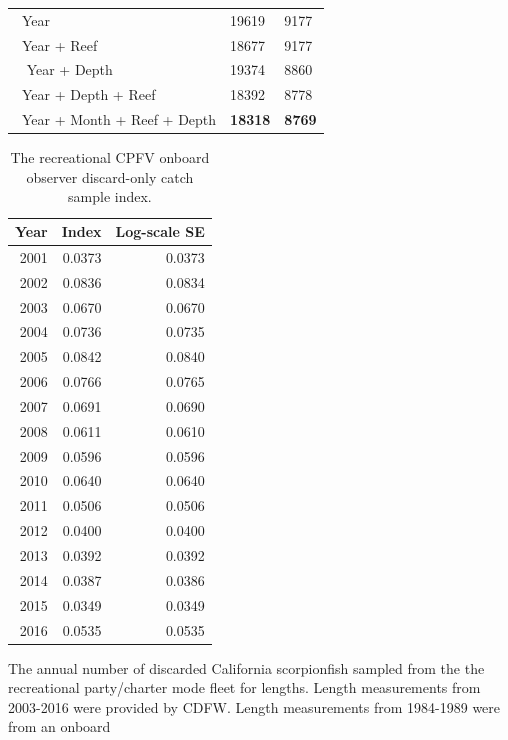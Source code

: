 \documentclass[12pt,]{article}
\begin{document}
\begin{table}[ht]
\begin{tabular}{lll}
  \hline
~Year & 19619 & 9177 \\ 
  ~Year + Reef & 18677 & 9177 \\ 
  ~ Year + Depth & 19374 & 8860 \\ 
  ~Year + Depth + Reef & 18392 & 8778 \\ 
  ~Year + Month + Reef + Depth & \textbf{18318} & \textbf{8769} \\ 
   \hline
\end{tabular}
\end{table}\begin{table}[ht]
\centering
\caption{The recreational CPFV
                                            onboard observer discard-only
                                            catch sample index.} 
\label{tab:Fleet6_RecDD_onboard_index}
\begin{tabular}{rrr}
  \hline
Year & Index & Log-scale SE \\ 
  \hline
 2001 & 0.0373 & 0.0373 \\ 
   2002 & 0.0836 & 0.0834 \\ 
   2003 & 0.0670 & 0.0670 \\ 
   2004 & 0.0736 & 0.0735 \\ 
   2005 & 0.0842 & 0.0840 \\ 
   2006 & 0.0766 & 0.0765 \\ 
   2007 & 0.0691 & 0.0690 \\ 
   2008 & 0.0611 & 0.0610 \\ 
   2009 & 0.0596 & 0.0596 \\ 
   2010 & 0.0640 & 0.0640 \\ 
   2011 & 0.0506 & 0.0506 \\ 
   2012 & 0.0400 & 0.0400 \\ 
   2013 & 0.0392 & 0.0392 \\ 
   2014 & 0.0387 & 0.0386 \\ 
   2015 & 0.0349 & 0.0349 \\ 
   2016 & 0.0535 & 0.0535 \\ 
   \hline
\end{tabular}
\end{table}\begin{table}[ht]
\centering
\caption{The annual number of discarded California scorpionfish 
                                              sampled from the the recreational party/charter 
                                              mode fleet for lengths. Length measurements
                                            from 2003-2016 were provided by CDFW.  
                                            Length measurements from 1984-1989 were from an onboard
}
\end{table}
\end{document}
